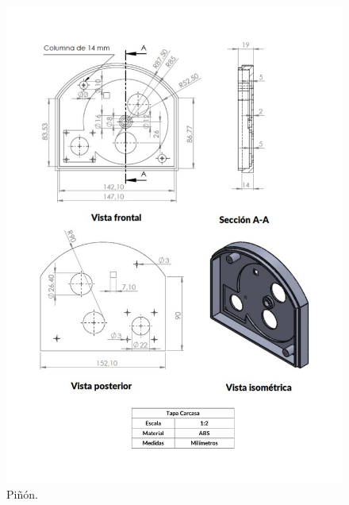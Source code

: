 \documentclass{article}
\begin{document}
\begin{figure}[ht]
\centering
\includegraphics[width=\textwidth]{PlanoTapaCarcasa.pdf}
\caption{Piñón.}
\end{figure}
\end{document}
